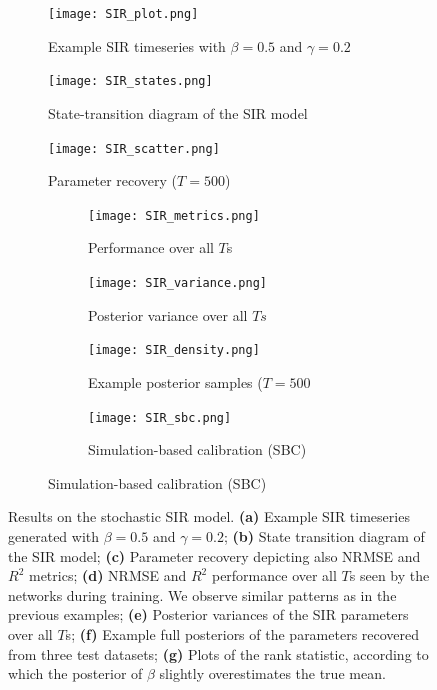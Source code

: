 \documentclass[9pt,twoside,lineno]{pnas-new}
\begin{document}
\begin{figure}[H]
\centering
\begin{subfigure}{.44\textwidth}
    \texttt{[image: SIR\_plot.png]}
    \caption{Example SIR timeseries with $\beta=0.5$ and $\gamma=0.2$}
    \label{fig:Fig.6a}
\end{subfigure}
\begin{subfigure}{.55\textwidth}
    \texttt{[image: SIR\_states.png]}
    \caption{State-transition diagram of the SIR model}
    \label{fig:Fig.6b}
\end{subfigure}
\begin{subfigure}{.49\textwidth}
    \texttt{[image: SIR\_scatter.png]}
    \caption{Parameter recovery ($T=500$)}
    \label{fig:Fig.6c}
\end{subfigure}
\begin{subfigure}{.49\textwidth}
    \centering
    \begin{subfigure}{.49\textwidth}
    	\texttt{[image: SIR\_metrics.png]}
    	\caption{Performance over all $T$s}
    	\label{fig:Fig.6d}
	\end{subfigure}
	\begin{subfigure}{.49\textwidth}
    	\texttt{[image: SIR\_variance.png]}
    	\caption{Posterior variance over all $Ts$}
    	\label{fig:Fig.6e}
	\end{subfigure}
	\begin{subfigure}{.49\textwidth}
    	\texttt{[image: SIR\_density.png]}
    	\caption{Example posterior samples ($T=500$}
    	\label{fig:Fig.6f}
	\end{subfigure}
	\begin{subfigure}{.49\textwidth}
    	\texttt{[image: SIR\_sbc.png]}
    	\caption{Simulation-based calibration (SBC)}
    	\label{fig:Fig.6g}
	\end{subfigure}
\end{subfigure}
\caption[short]{Results on the stochastic SIR model. \textbf{(a)} Example SIR timeseries generated with $\beta=0.5$ and $\gamma=0.2$; \textbf{(b)} State transition diagram of the SIR model; \textbf{(c)} Parameter recovery depicting also NRMSE and $R^{2}$ metrics; \textbf{(d)} NRMSE and $R^{2}$ performance over all $T$s seen by the networks during training. We observe similar patterns as in the previous examples; \textbf{(e)} Posterior variances of the SIR parameters over all $T$s; \textbf{(f)} Example full posteriors of the parameters recovered from three test datasets; \textbf{(g)} Plots of the rank statistic, according to which the posterior of $\beta$ slightly overestimates the true mean.} \label{fig:Fig.6}
\end{figure}
\end{document}
